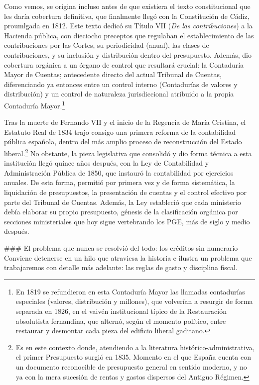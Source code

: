 \documentclass[10pt,a4paper]{article}
\begin{document}
Como vemos, se origina incluso antes de que existiera el texto constitucional que les daría cobertura definitiva, que finalmente llegó con la Constitución de Cádiz, proumlgada en 1812. Este texto dedicó su Título VII (\textit{De las contribuciones}) a la Hacienda pública, con dieciocho preceptos que regulaban el establecimiento de las contribuciones por las Cortes, su periodicidad (anual), las clases de contribuciones, y su inclusión y distribución dentro del presupuesto. Además, dio cobertura orgánica a un órgano de control que resultará crucial: la Contaduría Mayor de Cuentas; antecedente directo del actual Tribunal de Cuentas, diferenciando ya entonces entre un control interno (Contadurías de valores y distribución) y un control de naturaleza jurisdiccional atribuido a la propia Contaduría Mayor.\footnote{%
    En 1819 se refundieron en esta Contaduría Mayor las llamadas contadurías especiales (valores, distribución y millones), que volverían a resurgir de forma separada en 1826, en el vaivén institucional típico de la Restauración absolutista fernandina, que alternó, según el momento político, entre restaurar y desmontar cada pieza del edificio liberal gaditano.
}

Tras la muerte de Fernando VII y el inicio de la Regencia de María Cristina, el Estatuto Real de 1834 trajo consigo una primera reforma de la contabilidad pública española, dentro del más amplio proceso de reconstrucción del Estado liberal.\footnote{%
    Es en este contexto donde, atendiendo a la literatura histórico-administrativa, el primer Presupuesto surgió en 1835. Momento en el que España cuenta con un documento reconocible de presupuesto general en sentido moderno, y no ya con la mera sucesión de rentas y gastos dispersos del Antiguo Régimen.
} No obstante, la pieza legislativa que consolidó y dio forma técnica a esta institución llegó quince años después, con la Ley de Contabilidad y Administración Pública de 1850, que instauró la contabilidad por ejercicios anuales. De esta forma, permitió por primera vez y de forma sistemática, la liquidación de presupuestos, la presentación de cuentas y el control efectivo por parte del Tribunal de Cuentas. Además, la Ley estableció que cada ministerio debía elaborar su propio presupuesto, génesis de la clasificación orgánica por secciones ministeriales que hoy sigue vertebrando los PGE, más de siglo y medio después.

### El problema que nunca se resolvió del todo: los créditos sin numerario
Conviene detenerse en un hilo que atraviesa la historia e ilustra un problema que trabajaremos con detalle más adelante: las reglas de gasto y disciplina fiscal.
\end{document}
